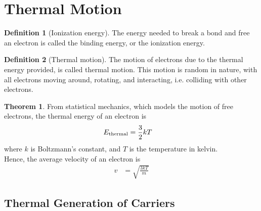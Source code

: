 \documentclass[titlepage, fleqn, a4paper, 12pt, twoside]{article}
\theoremstyle{definition}
\newtheorem{definition}{Definition}
\theoremstyle{theorem}
\newtheorem{theorem}{Theorem}
\let\Oldsection\section
\renewcommand{\section}{\FloatBarrier\Oldsection}
\let\Oldsubsection\subsection
\renewcommand{\subsection}{\FloatBarrier\Oldsubsection}
\begin{document}
\section{Thermal Motion}

\begin{definition}[Ionization energy]
	The energy needed to break a bond and free an electron is called the binding energy, or the ionization energy.
\end{definition}

\begin{definition}[Thermal motion]
	The motion of electrons due to the thermal energy provided, is called thermal motion.
	This motion is random in nature, with all electrons moving around, rotating, and interacting, i.e. colliding with other electrons.
\end{definition}

\begin{theorem}
	From statistical mechanics, which models the motion of free electrons, the thermal energy of an electron is
	\begin{align*}
		E_{\textnormal{thermal}} &= \frac{3}{2} k T
	\end{align*}
	where $k$ is Boltzmann's constant, and $T$ is the temperature in kelvin.\\
	Hence, the average velocity of an electron is
	\begin{align*}
		v &= \sqrt{\frac{3 k T}{m}}
	\end{align*}
\end{theorem}

\subsection{Thermal Generation of Carriers}
\end{document}
